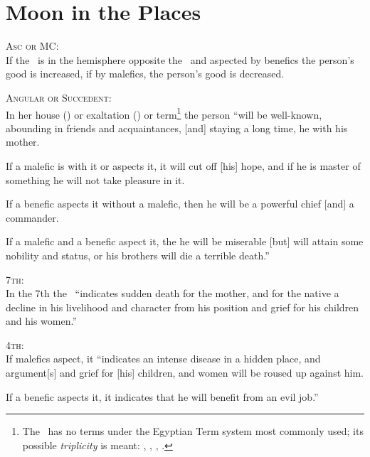 \section{Moon in the Places}

\textsc{Asc or MC:} \\
\indent If the \Moon\, is in the hemisphere opposite the \Sun\, and aspected by benefics the person's good is increased, if by  malefics, the person's good is decreased.

\noindent\textsc{Angular or Succedent:} \\
\indent In her house (\Cancer) or exaltation (\Taurus) or term\footnote{The \Moon\, has no terms under the Egyptian Term system most commonly used; its possible \textsl{triplicity} is meant: \Virgo, \Scorpio, \Capricorn, \Pisces.} the person ``will be well-known, abounding in friends and acquaintances, [and] staying a long time, he with his mother.

If a malefic is with it or aspects it, it will cut off [his] hope, and if he is master of something he will not take pleasure in it. 

If a benefic aspects it without a malefic, then he will be a powerful chief [and] a commander.

If a malefic and a benefic aspect it, the he will be miserable [but] will attain some nobility and status, or his brothers will die a terrible death.''

\noindent\textsc{7th:} \\
\indent In the 7th the \Moon\, ``indicates sudden death for the mother, and for the native a decline in his livelihood and character from his position and grief for his children and his women.''

\noindent\textsc{4th:} \\
\indent If malefics aspect, it ``indicates an intense disease in a hidden place, and argument[s] and grief for [his] children, and women will be roused up against him.

If a benefic aspects it, it indicates that he will benefit from an evil job.''





